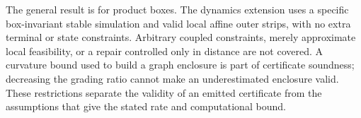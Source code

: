 The general result is for product boxes. The dynamics extension uses a
specific box-invariant stable simulation and valid local affine outer
strips, with no extra terminal or state constraints. Arbitrary coupled
constraints, merely approximate local feasibility, or a repair controlled
only in distance are not covered. A curvature bound used to build a graph
enclosure is part of certificate soundness; decreasing the grading ratio
cannot make an underestimated enclosure valid. These restrictions separate
the validity of an emitted certificate from the assumptions that give the
stated rate and computational bound.
